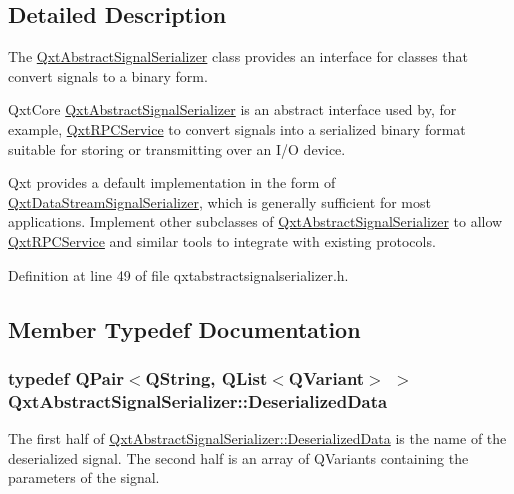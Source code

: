 \subsection{Detailed Description}
The \hyperlink{class_qxt_abstract_signal_serializer}{Qxt\-Abstract\-Signal\-Serializer} class provides an interface for classes that convert signals to a binary form. 

Qxt\-Core \hyperlink{class_qxt_abstract_signal_serializer}{Qxt\-Abstract\-Signal\-Serializer} is an abstract interface used by, for example, \hyperlink{class_qxt_r_p_c_service}{Qxt\-R\-P\-C\-Service} to convert signals into a serialized binary format suitable for storing or transmitting over an I/\-O device.

Qxt provides a default implementation in the form of \hyperlink{class_qxt_data_stream_signal_serializer}{Qxt\-Data\-Stream\-Signal\-Serializer}, which is generally sufficient for most applications. Implement other subclasses of \hyperlink{class_qxt_abstract_signal_serializer}{Qxt\-Abstract\-Signal\-Serializer} to allow \hyperlink{class_qxt_r_p_c_service}{Qxt\-R\-P\-C\-Service} and similar tools to integrate with existing protocols. 

Definition at line 49 of file qxtabstractsignalserializer.\-h.



\subsection{Member Typedef Documentation}
\hypertarget{class_qxt_abstract_signal_serializer_a101019f7e2f0c3267e01c1da89104b40}{
\subsubsection[{Deserialized\-Data}]{\setlength{\rightskip}{0pt plus 5cm}typedef Q\-Pair$<${\bf Q\-String}, {\bf Q\-List}$<$Q\-Variant$>$ $>$ {\bf Qxt\-Abstract\-Signal\-Serializer\-::\-Deserialized\-Data}}}\label{class_qxt_abstract_signal_serializer_a101019f7e2f0c3267e01c1da89104b40}
The first half of \hyperlink{class_qxt_abstract_signal_serializer_a101019f7e2f0c3267e01c1da89104b40}{Qxt\-Abstract\-Signal\-Serializer\-::\-Deserialized\-Data} is the name of the deserialized signal. The second half is an array of Q\-Variants containing the parameters of the signal. 

